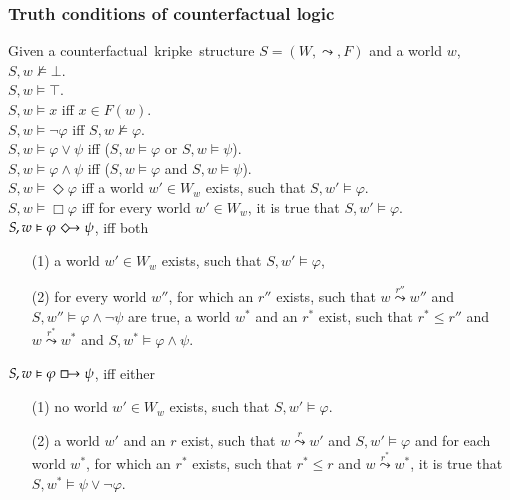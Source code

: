\documentclass[a4paper,american]{paper}
\theoremstyle{definition}\newtheorem{definition}{Definition}
\begin{document}
\subsubsection{Truth conditions of counterfactual logic}
Given a counterfactual~kripke~structure $S = (W, \leadsto ,F)$ and a world $w$,\\
$S,w\nvDash\bot$.\\
$S,w\vDash\top$.\\
$S,w\vDash x$ iff $x\in F(w)$.\\
$S,w\vDash \neg\varphi$ iff $S,w\nvDash\varphi$.\\
$S,w\vDash \varphi\vee\psi$ iff ($S,w\vDash\varphi$ or $S,w\vDash\psi$).\\
$S,w\vDash \varphi\wedge\psi$ iff ($S,w\vDash\varphi$ and $S,w\vDash\psi$).\\
$S,w\vDash \Diamond \varphi$ iff a world $w'\in W_w$ exists, such that $S,w' \vDash \varphi$.\\
$S,w\vDash \Box \varphi$ iff for every world $w'\in W_w$, it is true that $S,w' \vDash \varphi$.\\
$S,w\vDash \varphi \Diamondright \psi$, iff both 
\begin{itemize}
	\item[(1)] a world $w'\in W_w$ exists, such that $S,w' \vDash \varphi$,
	\item[(2)] for every world $w''$, for which an $r''$ exists, such that $w\overset{r''}{\leadsto}w''$ and $S,w'' \vDash \varphi\wedge\neg\psi$ are true, a world $w^*$ and an $r^*$ exist, such that $r^* \leq r''$ and $w\overset{r^*}{\leadsto}w^*$ and $S,w^* \vDash \varphi\wedge\psi$.
\end{itemize}

\noindent$S,w \vDash \varphi \boxright \psi$, iff either
\begin{itemize}
	\item[(1)] no world $w'\in W_w$ exists, such that $S,w' \vDash \varphi$.
	\item[(2)] a world $w'$ and an $r$ exist, such that $w\overset{r}{\leadsto} w'$ and $S,w'\vDash \varphi$ and for each world $w^*$, for which an $r^*$ exists, such that $r^*\leq r$ and $w\overset{r^*}{\leadsto} w^*$, it is true that $S,w^*\vDash\psi\vee\neg\varphi$.
\end{itemize}
\end{document}
